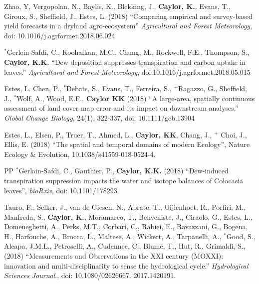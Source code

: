 \documentclass[10pt]{report}
\begin{document}
\begin{etaremune}

\item Zhao, Y, Vergopolan, N., Baylis, K., Blekking, J.,  \textbf{Caylor, K.}, Evans, T., Giroux, S., Sheffield, J., Estes, L. (2018) ``Comparing empirical and survey-based yield forecasts in a dryland agro-ecosystem'' {\em Agricultural and Forest Meteorology}, doi: 10.1016/j.agrformet.2018.06.024
 


\item $^{*}$Gerlein-Safdi, C., Koohafkan, M.C., Chung, M., Rockwell, F.E., Thompson, S., \textbf{Caylor, K.K.} ``Dew deposition suppresses transpiration and carbon uptake in leaves.'' {\em Agricultural and Forest Meteorology}, doi:10.1016/j.agrformet.2018.05.015

\item Estes, L. Chen, P.,  $^{*}$Debats, S., Evans, T., Ferreira, S., $^{+}$Ragazzo, G., Sheffield, J., $^{*}$Wolf, A., Wood, E.F.,  \textbf{Caylor KK} (2018) ``A large-area, spatially continuous assessment of land cover map error and its impact on downstream analyses.'' {\em Global Change Biology}, 24(1), 322-337, doi: 10.1111/gcb.13904

\item Estes, L., Elsen, P., Truer, T., Ahmed, L., \textbf{Caylor, KK}, Chang, J., $^{+}$ Choi, J., Ellis, E. (2018) ``The spatial and temporal domains of modern Ecology'', Nature Ecology \& Evolution, 10.1038/s41559-018-0524-4.

\item [PP] $^{*}$Gerlain-Safdi, C., Gauthier, P.,  \textbf{Caylor, K.K.} (2018) ``Dew-induced transpiration suppression impacts the water and isotope balances of Colocasia leaves'', {\em bioRxiv}, doi: 10.1101/178293

\item Tauro, F., Selker, J., van de Giesen, N., Abrate, T., Uijlenhoet, R., Porfiri, M., Manfreda, S., \textbf{Caylor, K.}, Moramarco, T., Benveniste, J., Ciraolo, G., Estes, L., Domeneghetti, A., Perks, M.T., Corbari, C., Rabiei, E., Ravazzani, G., Bogena, H., Harfouche, A., Brocca, L., Maltese, A., Wickert, A., Tarpanelli, A., $^{*}$Good, S., Alcapa, J.M.L., Petroselli, A., Cudennec, C., Blume, T., Hut, R., Grimaldi, S., (2018) ``Measurements and Observations in the XXI century (MOXXI): innovation and multi-disciplinarity to sense the hydrological cycle.'' {\em Hydrological Sciences Journal}., doi: 10.1080/02626667. 2017.1420191.



\end{etaremune}
\end{document}
